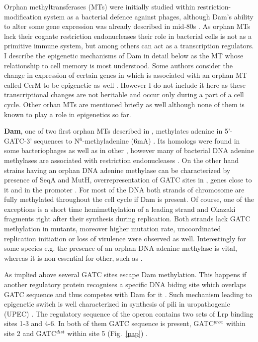 Orphan methyltransferases (MTs) were initially studied within restriction-modification system as a bacterial defence against phages, although Dam's ability to alter some gene expression was already described in mid-80s \cite{sternberg1985evidence, bickle1993biology}.
As orphan MTs lack their cognate restriction endonucleases their role in bacterial cells is not as a primitive immune system, but among others can act as a transcription regulators.
I describe the epigenetic mechanisms of Dam in detail below as the MT whose relationship to cell memory is most understood.
Some authors consider the change in expression of certain genes in  which is associated with an orphan MT called CcrM to be epigenetic as well \cite{casadesus2006epigenetic, adhikari2016dna}.
However I do not include it here as these transcriptional changes are not heritable and occur only during a part of a cell cycle.
Other  orhan MTs are mentioned briefly as well although none of them is known to play a role in epigenetics so far.

\textbf{Dam}, one of two first orphan MTs described in , methylates adenine in 5'-GATC-3' sequences to N$^6$-methyladenine (6mA) \cite{marinus1973isolation}.
Its homologs were found in some bacteriophages as well as in other , however many of bacterial DNA adenine methylases are associated with restriction endonucleases \cite{low2001roles, casadesus2006epigenetic, bochow2012bacteriophage}.
On the other hand strains having an orphan DNA adenine methylase can be characterized by presence of SeqA and MutH, overrepresentation of GATC sites in , genes close to it and in the  promoter \cite{sobetzko2016distamo}.
For most of the DNA both strands of chromosome are fully methylated throughout the cell cycle if Dam is present.
Of course, one of the exceptions is a short time hemimethylation of a leading strand and Okazaki fragments right after their synthesis during replication.
Both strands lack GATC methylation in  mutants, moreover higher mutation rate, uncoordinated replication initiation or loss of virulence were observed as well.
Interestingly for some species e.g.  the presence of an orphan DNA adenine methylase is vital, whereas it is non-essential for other, such as  \cite{casadesus2006epigenetic, casadesus2013programmed, adhikari2016dna}.

As implied above several GATC sites escape Dam methylation.
This happens if another regulatory protein recognises a specific DNA biding site which overlaps GATC sequence and thus competes with Dam for it \cite{correnti2002dam}.
Such mechanism leading to epigenetic switch is well characterized in synthesis of  pili in uropathogenic  (UPEC) \cite{peterson2008competitive}.
The regulatory sequence of the  operon contains two sets of Lrp binding sites 1-3 and 4-6.
In both of them GATC sequence is present, GATC$^{prox}$ within site 2 and GATC$^{dist}$ within site 5 (Fig.~\ref{pap}) \cite{blyn1990regulation}.

